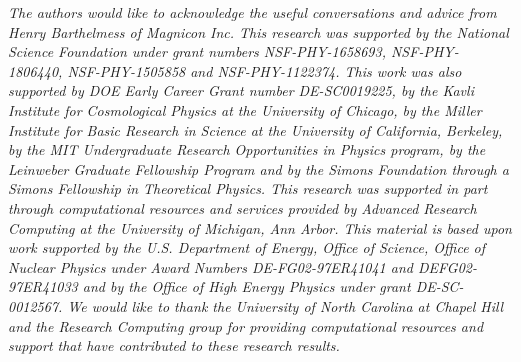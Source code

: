 \documentclass[aps,prl,amsmath,amssymb,reprint,superscriptaddress, nofootinbib,
]{revtex4-1}
\begin{document}
 


\begin{acknowledgments}
\it
The authors would like to acknowledge the useful conversations and advice from Henry Barthelmess of Magnicon Inc. This research was supported by the National Science Foundation under grant numbers NSF-PHY-1658693, NSF-PHY-1806440, NSF-PHY-1505858 and NSF-PHY-1122374. This work was also supported by DOE Early Career Grant number DE-SC0019225, by the Kavli Institute for Cosmological Physics at the University of Chicago, by the Miller Institute for Basic Research in Science at the University of California, Berkeley, by the MIT Undergraduate Research Opportunities in Physics program, by the Leinweber Graduate Fellowship Program and by the Simons Foundation through a Simons Fellowship in Theoretical Physics. This research was supported in part through computational resources and services provided by Advanced Research Computing at the University of Michigan, Ann Arbor. This material is based upon work supported by the U.S. Department of Energy, Office of Science, Office of Nuclear Physics under Award Numbers DE-FG02-97ER41041 and DEFG02-97ER41033 and by the Office of High Energy Physics under grant DE-SC-0012567. We would like to thank the University of North Carolina at Chapel Hill and the Research Computing group for providing computational resources and support that have contributed to these research results.
\end{acknowledgments}
\end{document}
